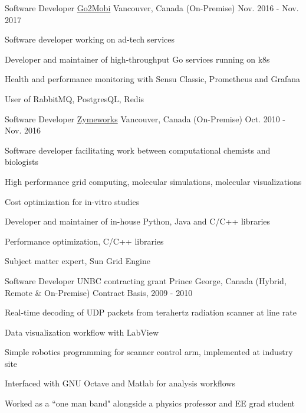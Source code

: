 \begin{cventries}
  \cventry
	{Software Developer}
	{\href{https://www.go2mobi.com}{Go2Mobi}}
	{Vancouver, Canada (On-Premise)}
	{Nov. 2016 - Nov. 2017}
	{
	  \begin{cvitems}
		\item {Software developer working on ad-tech services}
		\item {Developer and maintainer of high-throughput Go services running on k8s}
		\item {Health and performance monitoring with Sensu Classic, Prometheus and Grafana}
		\item {User of RabbitMQ, PostgresQL, Redis}
	  \end{cvitems}
	}


  \cventry
	{Software Developer}
	{\href{https://www.zymeworks.com}{Zymeworks}}
	{Vancouver, Canada (On-Premise)}
	{Oct. 2010 - Nov. 2016}
	{
	  \begin{cvitems}
		\item {Software developer facilitating work between computational chemists and biologists}
		\item {High performance grid computing, molecular simulations, molecular visualizations}
		\item {Cost optimization for in-vitro studies}
		\item {Developer and maintainer of in-house Python, Java and C/C++ libraries}
		\item {Performance optimization, C/C++ libraries}
		\item {Subject matter expert, Sun Grid Engine}
	  \end{cvitems}
	}


  \cventry
	{Software Developer}
	{UNBC contracting grant}
	{Prince George, Canada (Hybrid, Remote \& On-Premise)}
	{Contract Basis, 2009 - 2010}
	{
	  \begin{cvitems}
	  	\item{Real-time decoding of UDP packets from terahertz radiation scanner at line rate}
	  	\item{Data visualization workflow with LabView}
	  	\item{Simple robotics programming for scanner control arm, implemented at industry site}
	  	\item{Interfaced with GNU Octave and Matlab for analysis workflows}
	  	\item{Worked as a ``one man band" alongside a physics professor and EE grad student}
	  \end{cvitems}
	}

\end{cventries}
